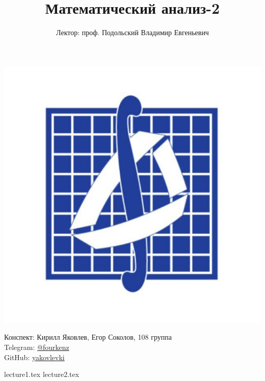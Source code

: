 \documentclass[a4paper, 12pt]{article}
\title{\textbf{Математический анализ-2}}
\author{Лектор: проф. Подольский Владимир Евгеньевич}
\begin{document}
    
\fontsize{14pt}{20pt}\selectfont
\maketitle
\vspace{0.3cm}
\begin{center}
    \includegraphics[width=0.75\linewidth]{Images/mehmat.png}
\end{center}
\vspace{1.5cm}
\begin{center}
    Конспект: Кирилл Яковлев, Егор Соколов, 108 группа\\
    Telegram: \href{https://t.me/fourkenz}{@fourkenz}\\
    GitHub: \href{https://github.com/yakovlevki}{yakovlevki}\\
\end{center}
    
\newpage
\tableofcontents
\newpage

{lecture1.tex}
{lecture2.tex}
\end{document}
